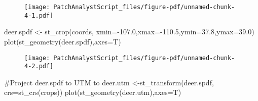 \documentclass[
  letterpaper,
]{book}
\newenvironment{Shaded}{\begin{snugshade}}{\end{snugshade}}
\newcommand{\AttributeTok}[1]{\textcolor[rgb]{0.40,0.45,0.13}{#1}}
\newcommand{\CommentTok}[1]{\textcolor[rgb]{0.37,0.37,0.37}{#1}}
\newcommand{\FloatTok}[1]{\textcolor[rgb]{0.68,0.00,0.00}{#1}}
\newcommand{\FunctionTok}[1]{\textcolor[rgb]{0.28,0.35,0.67}{#1}}
\newcommand{\NormalTok}[1]{\textcolor[rgb]{0.00,0.23,0.31}{#1}}
\newcommand{\OtherTok}[1]{\textcolor[rgb]{0.00,0.23,0.31}{#1}}
\newcommand{\SpecialCharTok}[1]{\textcolor[rgb]{0.37,0.37,0.37}{#1}}
\newcommand{\StringTok}[1]{\textcolor[rgb]{0.13,0.47,0.30}{#1}}
\begin{document}
\begin{Shaded}
\end{Shaded}

\begin{figure}[H]

{\centering \texttt{[image: PatchAnalystScript\_files/figure-pdf/unnamed-chunk-4-1.pdf]}

}

\end{figure}

\begin{Shaded}
\begin{Highlighting}[]
\NormalTok{deer.spdf }\OtherTok{\textless{}{-}} \FunctionTok{st\_crop}\NormalTok{(coords, }\AttributeTok{xmin=}\SpecialCharTok{{-}}\FloatTok{107.0}\NormalTok{,}\AttributeTok{xmax=}\SpecialCharTok{{-}}\FloatTok{110.5}\NormalTok{,}\AttributeTok{ymin=}\FloatTok{37.8}\NormalTok{,}\AttributeTok{ymax=}\FloatTok{39.0}\NormalTok{)}
\FunctionTok{plot}\NormalTok{(}\FunctionTok{st\_geometry}\NormalTok{(deer.spdf),}\AttributeTok{axes=}\NormalTok{T)}
\end{Highlighting}
\end{Shaded}

\begin{figure}[H]

{\centering \texttt{[image: PatchAnalystScript\_files/figure-pdf/unnamed-chunk-4-2.pdf]}

}

\end{figure}

\begin{Shaded}
\begin{Highlighting}[]
\CommentTok{\#Project deer.spdf to UTM to }
\NormalTok{deer.utm }\OtherTok{\textless{}{-}}\FunctionTok{st\_transform}\NormalTok{(deer.spdf, }\AttributeTok{crs=}\FunctionTok{st\_crs}\NormalTok{(crops))}
\FunctionTok{plot}\NormalTok{(}\FunctionTok{st\_geometry}\NormalTok{(deer.utm),}\AttributeTok{axes=}\NormalTok{T)}
\end{Highlighting}
\end{Shaded}
\end{document}
